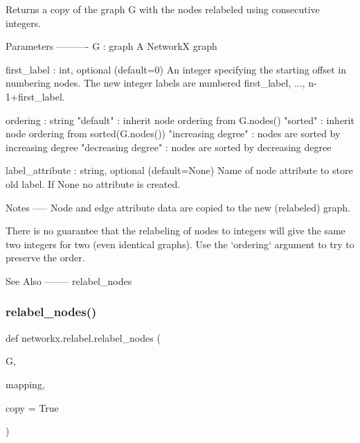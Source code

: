 \begin{DoxyVerb}Returns a copy of the graph G with the nodes relabeled using
consecutive integers.

Parameters
----------
G : graph
   A NetworkX graph

first_label : int, optional (default=0)
   An integer specifying the starting offset in numbering nodes.
   The new integer labels are numbered first_label, ..., n-1+first_label.

ordering : string
   "default" : inherit node ordering from G.nodes()
   "sorted"  : inherit node ordering from sorted(G.nodes())
   "increasing degree" : nodes are sorted by increasing degree
   "decreasing degree" : nodes are sorted by decreasing degree

label_attribute : string, optional (default=None)
   Name of node attribute to store old label.  If None no attribute
   is created.

Notes
-----
Node and edge attribute data are copied to the new (relabeled) graph.

There is no guarantee that the relabeling of nodes to integers will
give the same two integers for two (even identical graphs).
Use the `ordering` argument to try to preserve the order.

See Also
--------
relabel_nodes
\end{DoxyVerb}
 \mbox{\label{namespacenetworkx_1_1relabel_acb2e932876a58ed2a6eea531eb4f64f7}} 
\subsubsection{\texorpdfstring{relabel\+\_\+nodes()}{relabel\_nodes()}}
{\footnotesize\ttfamily def networkx.\+relabel.\+relabel\+\_\+nodes (\begin{DoxyParamCaption}\item[{}]{G,  }\item[{}]{mapping,  }\item[{}]{copy = {\ttfamily True} }\end{DoxyParamCaption})}

